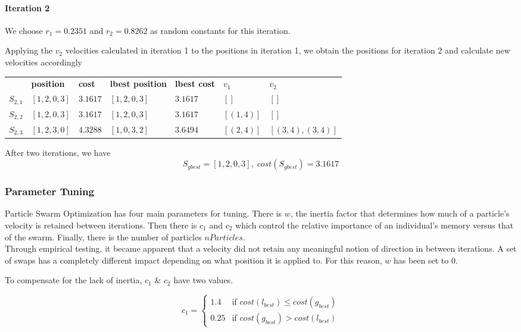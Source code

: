\documentclass[a4paper]{article}
\newcommand{\subsubsubsection}[1]{\paragraph{#1} \mbox{}}
\begin{document}
\subsubsubsection{Iteration 2}

We choose $r_1 = 0.2351$ and $r_2 = 0.8262$ as random constants for this
iteration.

Applying the $v_2$ velocities calculated in iteration 1 to the positions in
iteration 1, we obtain the positions for iteration 2 and calculate new
velocities accordingly
\begin{center}
\begin{tabular}{lllllll}
          & \textbf{position} & \textbf{cost} & \textbf{lbest position} & \textbf{lbest cost} & $v_1$      & $v_2$            \\
$S_{2,1}$ & $[1, 2, 0, 3]$    & $3.1617$      & $[1, 2, 0, 3]$          & $3.1617$            & $[]      $ & $[]$             \\
$S_{2,2}$ & $[1, 2, 0, 3]$    & $3.1617$      & $[1, 2, 0, 3]$          & $3.1617$            & $[(1, 4)]$ & $[]$             \\
$S_{2,3}$ & $[1, 2, 3, 0]$    & $4.3288$      & $[1, 0, 3, 2]$          & $3.6494$            & $[(2, 4)]$ & $[(3,4), (3,4)]$ \\
\end{tabular}
\end{center}
\vspace{1.5em}

After two iterations, we have
$$S_\mathit{gbest} = [1, 2, 0, 3], \; cost(S_\mathit{gbest}) = 3.1617$$

\subsubsection{Parameter Tuning}
Particle Swarm Optimization has four main parameters for tuning. There is $w$, the inertia factor that determines how much of a particle's velocity is retained between iterations.
Then there is $c_1$ and $c_2$ which control the relative importance of an individual's memory versus that of the swarm.
Finally, there is the number of particles $nParticles$.\\

Through empirical testing, it became apparent that a velocity did not retain any meaningful notion of direction in between iterations. A set of swaps has a completely different impact depending on what position it is applied to. For this reason, $w$ has been set to 0.

To compensate for the lack of inertia, $c_1$ \& $c_2$ have two values.

$$
c_1 =
\begin{cases}
1.4 & \text{if } \mathit{cost}(l_\mathit{best}) \leq \mathit{cost}(g_\mathit{best})\\
0.25 & \text{if } \mathit{cost}(g_\mathit{best}) > \mathit{cost}(l_\mathit{best})
\end{cases}
$$
\end{document}
